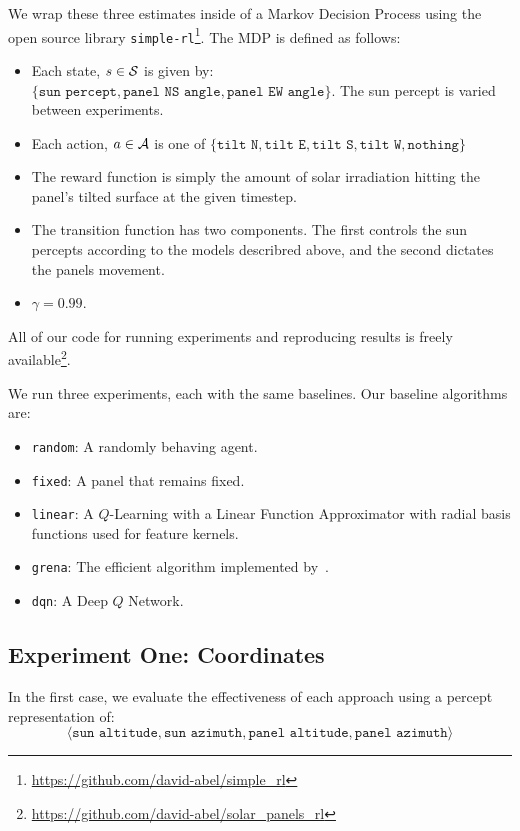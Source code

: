 \documentclass[11pt]{article}
\begin{document}
We wrap these three estimates inside of a Markov Decision Process using the open source library \texttt{simple-rl}\footnote{\url{https://github.com/david-abel/simple_rl}}. The MDP is defined as follows:
\begin{itemize}
\item Each state, $s \in \mathcal{S}$ is given by: $\{ \texttt{sun percept}, \texttt{panel NS angle}, \texttt{panel EW angle} \}$. The sun percept is varied between experiments.
\item Each action, $a \in \mathcal{A}$ is one of $\{\texttt{tilt N}, \texttt{tilt E}, \texttt{tilt S}, \texttt{tilt W}, \texttt{nothing}\}$
\item The reward function is simply the amount of solar irradiation hitting the panel's tilted surface at the given timestep.
\item The transition function has two components. The first controls the sun percepts according to the models describred above, and the second dictates the panels movement.
\item $\gamma = 0.99$.
\end{itemize}

All of our code for running experiments and reproducing results is freely available\footnote{\url{https://github.com/david-abel/solar_panels_rl}}.

We run three experiments, each with the same baselines. Our baseline algorithms are:
\begin{itemize}
\item \texttt{random}: A randomly behaving agent.
\item \texttt{fixed}: A panel that remains fixed.
\item \texttt{linear}: A $Q$-Learning with a Linear Function Approximator with radial basis functions used for feature kernels.
\item \texttt{grena}: The efficient algorithm implemented by~\citet{Grena2008}.
\item \texttt{dqn}: A Deep $Q$ Network.
\end{itemize}

\subsection{Experiment One: Coordinates}

In the first case, we evaluate the effectiveness of each approach using a percept representation of:
\begin{equation}
\langle \texttt{sun altitude}, \texttt{sun azimuth}, \texttt{panel altitude}, \texttt{panel azimuth} \rangle
\end{equation}
\end{document}
